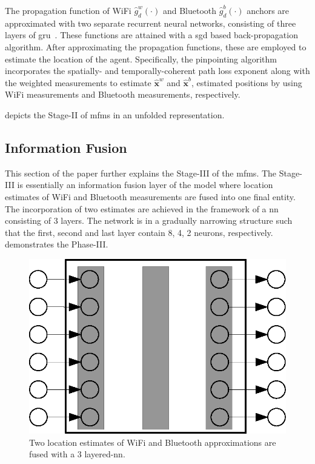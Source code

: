     The propagation function of WiFi $\hat{g}^w_d(\cdot)$ and Bluetooth $\hat{g}^b_d(\cdot)$ anchors are approximated with two separate recurrent neural networks, consisting of three layers of \gls{gru}~\cite{cho2014learning}.
    These functions are attained with a \gls{sgd} based back-propagation algorithm.
    After approximating the propagation functions, these are employed to estimate the location of the agent.
    Specifically, the pinpointing algorithm incorporates the spatially- and temporally-coherent path loss exponent along with the weighted measurements to estimate $\bm{\hat{x}}^w$ and $\bm{\hat{x}}^b$, estimated positions by using WiFi measurements and Bluetooth measurements, respectively.

     depicts the Stage-II of \gls{mfms} in an unfolded representation.


    \subsection{Information Fusion}
    This section of the paper further explains the Stage-III of the \gls{mfms}.
    The Stage-III is essentially an information fusion layer of the model where location estimates of WiFi and Bluetooth measurements are fused into one final entity.
    The incorporation of two estimates are achieved in the framework of a \gls{nn} consisting of 3 layers.
    The network is in a gradually narrowing structure such that the first, second and last layer contain 8, 4, 2 neurons, respectively.
     demonstrates the Phase-III\@.

    \begin{figure}[thpb]
       \centering
       \includegraphics[width=0.95\linewidth]{figures/fusion.eps}
       \caption{\label{fig:fusion}Two location estimates of WiFi and Bluetooth approximations are fused with a 3 layered-\gls{nn}.}
    \end{figure}
